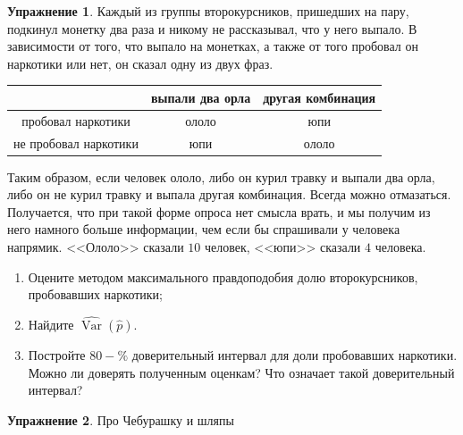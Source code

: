 \documentclass[12pt, a4paper, oneside]{extreport}
\DeclareMathOperator{\Var}{Var}
\theoremstyle{plain}              %
\theoremstyle{definition}         %
\newtheorem{problem}{\color{myblue} Упражнение}
\begin{document}
\begin{problem} 
Каждый из группы второкурсников, пришедших на пару, подкинул монетку два раза и никому не рассказывал, что у него выпало. В зависимости от того, что выпало на монетках, а также от того пробовал он наркотики или нет, он сказал одну из двух фраз.
	
	\begin{center}
		\begin{tabular}{c|c|c}
		                                 &  выпали два орла   & другая комбинация   \\ \hline
пробовал наркотики      &   ололо                     &   юпи       \\ \hline
не пробовал наркотики &	  юпи	                     &   ололо      \\
		\end{tabular}
	\end{center}
	
Таким образом, если человек ололо, либо он курил травку и выпали два орла, либо он не курил травку и выпала другая комбинация. Всегда можно отмазаться. Получается, что при такой форме опроса нет смысла врать, и мы получим из него намного больше информации, чем если бы спрашивали у человека напрямик.  <<Ололо>> сказали $10$ человек, <<юпи>> сказали $4$ человека.

\begin{enumerate}
	\item  Оцените методом максимального правдоподобия долю второкурсников, пробовавших наркотики;
	\item Найдите $\hat{\Var}(\hat p)$. 
	\item Постройте $80-\%$ доверительный интервал для доли пробовавших наркотики. Можно ли доверять полученным оценкам? Что означает такой доверительный интервал? 
\end{enumerate}

\end{problem}



\begin{problem} 
	Про Чебурашку и шляпы 


	\begin{sol}

	\end{sol}
\end{problem}
\end{document}
